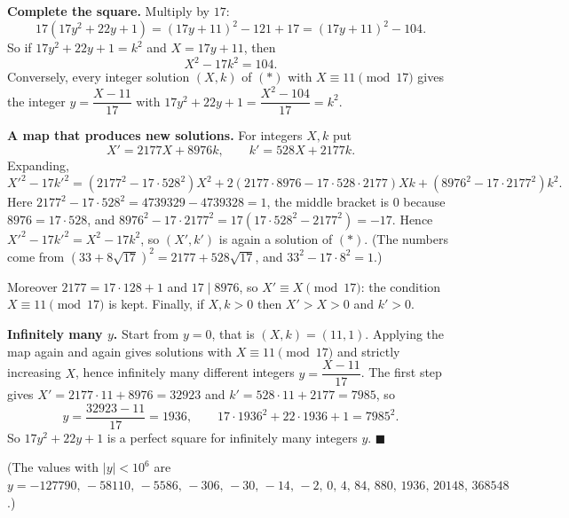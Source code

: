 \textbf{Complete the square.} Multiply by $17$:
\[
17\left(17y^2+22y+1\right)=(17y+11)^2-121+17=(17y+11)^2-104 .
\]
So if $17y^2+22y+1=k^2$ and $X=17y+11$, then
\[
X^2-17k^2=104. \tag{$*$}
\]
Conversely, every integer solution $(X,k)$ of $(*)$ with $X\equiv 11\pmod{17}$ gives the integer $y=\dfrac{X-11}{17}$ with $17y^2+22y+1=\dfrac{X^2-104}{17}=k^2$.

\textbf{A map that produces new solutions.} For integers $X,k$ put
\[
X'=2177X+8976k,\qquad k'=528X+2177k .
\]
Expanding,
\[
X'^2-17k'^2=\left(2177^2-17\cdot528^2\right)X^2+2\left(2177\cdot8976-17\cdot528\cdot2177\right)Xk+\left(8976^2-17\cdot2177^2\right)k^2 .
\]
Here $2177^2-17\cdot528^2=4739329-4739328=1$, the middle bracket is $0$ because $8976=17\cdot528$, and $8976^2-17\cdot2177^2=17\left(17\cdot528^2-2177^2\right)=-17$. Hence $X'^2-17k'^2=X^2-17k^2$, so $(X',k')$ is again a solution of $(*)$. (The numbers come from $(33+8\sqrt{17})^2=2177+528\sqrt{17}$, and $33^2-17\cdot8^2=1$.)

Moreover $2177=17\cdot128+1$ and $17\mid 8976$, so $X'\equiv X\pmod{17}$: the condition $X\equiv11\pmod{17}$ is kept. Finally, if $X,k>0$ then $X'>X>0$ and $k'>0$.

\textbf{Infinitely many $y$.} Start from $y=0$, that is $(X,k)=(11,1)$. Applying the map again and again gives solutions with $X\equiv 11\pmod{17}$ and strictly increasing $X$, hence infinitely many different integers $y=\dfrac{X-11}{17}$. The first step gives $X'=2177\cdot11+8976=32923$ and $k'=528\cdot11+2177=7985$, so
\[
y=\dfrac{32923-11}{17}=1936,\qquad 17\cdot1936^2+22\cdot1936+1=7985^2 .
\]
So $17y^2+22y+1$ is a perfect square for infinitely many integers $y$. $\blacksquare$

(The values with $|y|<10^6$ are $y=-127790,\,-58110,\,-5586,\,-306,\,-30,\,-14,\,-2,\,0,\,4,\,84,\,880,\,1936,\,20148,\,368548$.)
